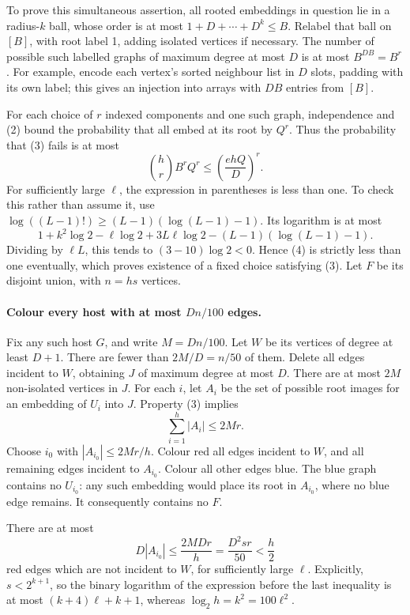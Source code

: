 To prove this simultaneous assertion, all rooted embeddings in
question lie in a radius-\(k\) ball, whose order is at most
\(1+D+\cdots+D^k\leq B\).
Relabel that ball on \([B]\), with root label 1, adding isolated
vertices if necessary. The number of possible such labelled graphs
of maximum degree at most \(D\) is at most \(B^{DB}=B^r\).
For example, encode each vertex's sorted neighbour list in \(D\)
slots, padding with its own label; this gives an injection into
arrays with \(DB\) entries from \([B]\).

For each choice of \(r\) indexed components and one such graph,
independence and (2) bound the probability that all embed at its
root by \(Q^r\). Thus the probability that (3) fails is at most
\[
 \binom hr B^r Q^r
 \leq\left(\frac{ehQ}{D}\right)^r. \tag{4}
\]
For sufficiently large \(\ell\), the expression in parentheses is
less than one. To check this rather than assume it, use
\(\log((L-1)!)\geq(L-1)(\log(L-1)-1)\). Its logarithm is at most
\[
 1+k^2\log2-\ell\log2+3L\ell\log2
 -(L-1)(\log(L-1)-1).
\]
Dividing by \(\ell L\), this tends to
\((3-10)\log2<0\). Hence (4) is strictly less than one eventually,
which proves existence of a fixed choice satisfying (3).
Let \(F\) be its disjoint union, with \(n=hs\) vertices.

\paragraph{Colour every host with at most \(Dn/100\) edges.}
Fix any such host \(G\), and write \(M=Dn/100\).
Let \(W\) be its vertices of degree at least \(D+1\).
There are fewer than \(2M/D=n/50\) of them.
Delete all edges incident to \(W\), obtaining \(J\) of maximum
degree at most \(D\). There are at most \(2M\) non-isolated vertices
in \(J\). For each \(i\), let \(A_i\) be the set of possible root
images for an embedding of \(U_i\) into \(J\).
Property (3) implies
\[
 \sum_{i=1}^h|A_i|\leq2Mr.
\]
Choose \(i_0\) with \(|A_{i_0}|\leq2Mr/h\).
Colour red all edges incident to \(W\), and all remaining edges
incident to \(A_{i_0}\). Colour all other edges blue.
The blue graph contains no \(U_{i_0}\): any such embedding would
place its root in \(A_{i_0}\), where no blue edge remains.
It consequently contains no \(F\).

There are at most
\[
 D|A_{i_0}|\leq\frac{2MDr}{h}
 =\frac{D^2sr}{50}<\frac h2 \tag{5}
\]
red edges which are not incident to \(W\), for sufficiently large
\(\ell\). Explicitly, \(s<2^{k+1}\), so the binary logarithm of
the expression before the last inequality is at most
\((k+4)\ell+k+1\), whereas \(\log_2h=k^2=100\ell^2\).

